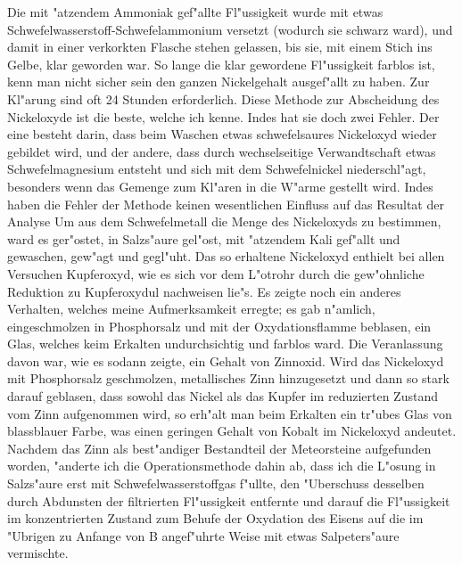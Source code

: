 \documentclass[a4paper, 11pt, oneside]{article}
\begin{document}
Die mit "atzendem Ammoniak gef"allte Fl"ussigkeit wurde mit etwas Schwefelwasserstoff-Schwefelammonium versetzt (wodurch sie schwarz ward), und damit in einer verkorkten Flasche stehen gelassen, bis sie, mit einem Stich ins Gelbe, klar geworden war. So lange die klar gewordene Fl"ussigkeit farblos ist, kenn man nicht sicher sein den ganzen Nickelgehalt ausgef"allt zu haben. Zur Kl"arung sind oft 24 Stunden erforderlich. Diese Methode zur Abscheidung des Nickeloxyde ist die beste, welche ich kenne. Indes hat sie doch zwei Fehler. Der eine besteht darin, dass beim Waschen etwas schwefelsaures Nickeloxyd wieder gebildet wird, und der andere, dass durch wechselseitige Verwandtschaft etwas Schwefelmagnesium entsteht und sich mit dem Schwefelnickel niederschl"agt, besonders wenn das Gemenge zum Kl"aren in die W"arme gestellt wird. Indes haben die Fehler der Methode keinen wesentlichen Einfluss auf das Resultat der Analyse Um aus dem Schwefelmetall die Menge des Nickeloxyds zu bestimmen, ward es ger"ostet, in Salzs"aure gel"ost, mit "atzendem Kali gef"allt und gewaschen, gew"agt und gegl"uht. Das so erhaltene Nickeloxyd enthielt bei allen Versuchen Kupferoxyd, wie es sich vor dem L"otrohr durch die gew"ohnliche Reduktion zu Kupferoxydul nachweisen lie"s. Es zeigte noch ein anderes Verhalten, welches meine Aufmerksamkeit erregte; es gab n"amlich, eingeschmolzen in Phosphorsalz und mit der Oxydationsflamme beblasen, ein Glas, welches keim Erkalten undurchsichtig und farblos ward. Die Veranlassung davon war, wie es sodann zeigte, ein Gehalt von Zinnoxid. Wird das Nickeloxyd mit Phosphorsalz geschmolzen, metallisches Zinn hinzugesetzt und dann so stark darauf geblasen, dass sowohl das Nickel als das Kupfer im reduzierten Zustand vom Zinn aufgenommen wird, so erh"alt man beim Erkalten ein tr"ubes Glas von blassblauer Farbe, was einen geringen Gehalt von Kobalt im Nickeloxyd andeutet. Nachdem das Zinn als best"andiger Bestandteil der Meteorsteine aufgefunden worden, "anderte ich die Operationsmethode dahin ab, dass ich die L"osung in Salzs"aure erst mit Schwefelwasserstoffgas f"ullte, den "Uberschuss desselben durch Abdunsten der filtrierten Fl"ussigkeit entfernte und darauf die Fl"ussigkeit im konzentrierten Zustand zum Behufe der Oxydation des Eisens auf die im "Ubrigen zu Anfange von B angef"uhrte Weise mit etwas Salpeters"aure vermischte.
\end{document}
